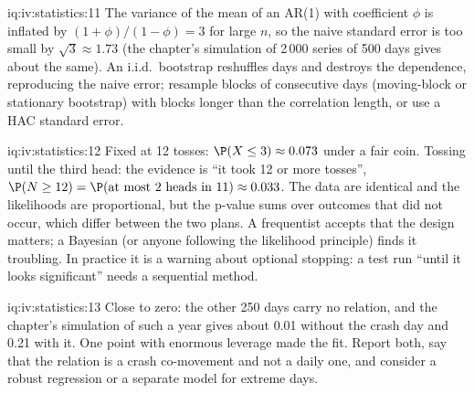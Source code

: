 \begin{solution}{iq:iv:statistics:11}
The variance of the mean of an AR(1) with coefficient $\phi$ is inflated by $(1 + \phi)/(1 - \phi) = 3$ for large $n$, so
the naive standard error is too small by $\sqrt3 \approx 1.73$ (the chapter's simulation of 2\,000 series of 500 days
gives about the same). An i.i.d.\ bootstrap reshuffles days and destroys the dependence, reproducing the naive error;
resample blocks of consecutive days (moving-block or stationary bootstrap) with blocks longer than the correlation length,
or use a HAC standard error.
\end{solution}

\begin{solution}{iq:iv:statistics:12}
Fixed at 12 tosses: $\P(X \le 3) \approx 0.073$ under a fair coin. Tossing until the third head: the evidence is ``it took
12 or more tosses'', $\P(N \ge 12) = \P(\text{at most 2 heads in 11}) \approx 0.033$. The data are identical and the
likelihoods are proportional, but the p-value sums over outcomes that did not occur, which differ between the two plans.
A frequentist accepts that the design matters; a Bayesian (or anyone following the likelihood principle) finds it
troubling. In practice it is a warning about optional stopping: a test run ``until it looks significant'' needs a
sequential method.
\end{solution}

\begin{solution}{iq:iv:statistics:13}
Close to zero: the other 250 days carry no relation, and the chapter's simulation of such a year gives about 0.01 without
the crash day and 0.21 with it. One point with enormous leverage made the fit. Report both, say that the relation is a
crash co-movement and not a daily one, and consider a robust regression or a separate model for extreme days.
\end{solution}
